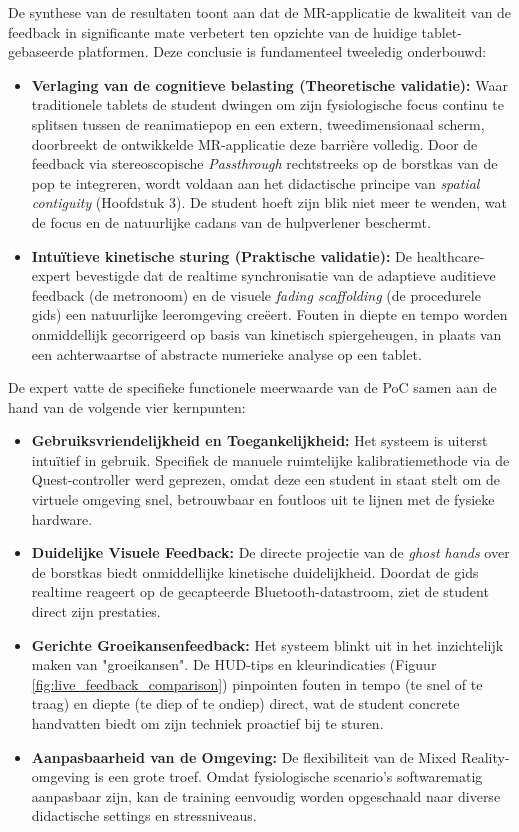 De synthese van de resultaten toont aan dat de MR-applicatie de kwaliteit van de feedback in significante mate verbetert ten opzichte van de huidige 
tablet-gebaseerde platformen. Deze conclusie is fundamenteel tweeledig onderbouwd:

\begin{itemize}
    \item \textbf{Verlaging van de cognitieve belasting (Theoretische validatie):} Waar traditionele tablets de student dwingen om zijn fysiologische focus continu te 
    splitsen tussen de reanimatiepop en een extern, tweedimensionaal scherm, doorbreekt de ontwikkelde MR-applicatie deze barrière volledig. Door de feedback via 
    stereoscopische \textit{Passthrough} rechtstreeks op de borstkas van de pop te integreren, wordt voldaan aan het didactische principe van \textit{spatial contiguity} 
    (Hoofdstuk 3). De student hoeft zijn blik niet meer te wenden, wat de focus en de natuurlijke cadans van de hulpverlener beschermt.
    \item \textbf{Intuïtieve kinetische sturing (Praktische validatie):} De healthcare-expert bevestigde dat de realtime synchronisatie van de adaptieve auditieve 
    feedback (de metronoom) en de visuele \textit{fading scaffolding} (de procedurele gids) een natuurlijke leeromgeving creëert. Fouten in diepte en tempo worden 
    onmiddellijk gecorrigeerd op basis van kinetisch spiergeheugen, in plaats van een achterwaartse of abstracte numerieke analyse op een tablet.
\end{itemize}

De expert vatte de specifieke functionele meerwaarde van de PoC samen aan de hand van de volgende vier kernpunten:

\begin{itemize}
    \item \textbf{Gebruiksvriendelijkheid en Toegankelijkheid:} Het systeem is uiterst intuïtief in gebruik. Specifiek de manuele ruimtelijke kalibratiemethode via de 
    Quest-controller werd geprezen, omdat deze een student in staat stelt om de virtuele omgeving snel, betrouwbaar en foutloos uit te lijnen met de fysieke hardware.
    \item \textbf{Duidelijke Visuele Feedback:} De directe projectie van de \textit{ghost hands} over de borstkas biedt onmiddellijke kinetische duidelijkheid. 
    Doordat de gids realtime reageert op de gecapteerde Bluetooth-datastroom, ziet de student direct zijn prestaties.
    \item \textbf{Gerichte Groeikansenfeedback:} Het systeem blinkt uit in het inzichtelijk maken van "groeikansen". 
    De HUD-tips en kleurindicaties (Figuur \ref{fig:live_feedback_comparison}) pinpointen fouten in tempo (te snel of te traag) en diepte (te diep of te ondiep) 
    direct, wat de student concrete handvatten biedt om zijn techniek proactief bij te sturen.
    \item \textbf{Aanpasbaarheid van de Omgeving:} De flexibiliteit van de Mixed Reality-omgeving is een grote troef. Omdat fysiologische scenario's softwarematig 
    aanpasbaar zijn, kan de training eenvoudig worden opgeschaald naar diverse didactische settings en stressniveaus.
\end{itemize}

